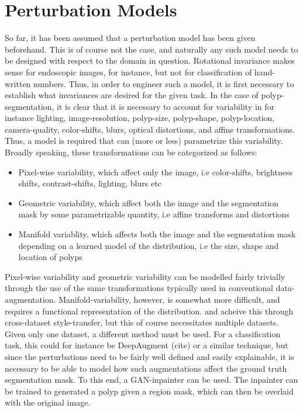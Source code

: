 \section{Perturbation Models}
So far, it has been assumed that a perturbation model has been given beforehand. This is of course not the case, and naturally any such model needs to be designed with respect to the domain in question. Rotational invariance makes sense for endoscopic images, for instance, but not for classification of hand-written numbers. Thus, in order to engineer such a model, it is first necessary to establish what invariances are desired for the given task. In the case of polyp-segmentation, it is clear that it is necessary to account for variability in for instance lighting, image-resolution, polyp-size, polyp-shape, polyp-location, camera-quality, color-shifts, blurs, optical distortions, and affine transformations. Thus, a model is required that can (more or less) parametrize this variability. Broadly speaking, these transformations can be categorized as follows:
\begin{itemize}
    \item Pixel-wise variability, which affect only the image, i.e color-shifts, brightness shifts, contrast-shifts, lighting, blurs etc
    \item Geometric variability, which affect both the image and the segmentation mask by some parametrizable quantity, i.e affine transforms and distortions
    \item Manifold variablity, which affects both the image and the segmentation mask depending on a learned model of the distribution,  i.e the size, shape and location of polyps
\end{itemize}
Pixel-wise variability and geometric variability can be modelled fairly trivially through the use of the same transformations typically used in conventional data-augmentation. Manifold-variability, however, is somewhat more difficult, and requires a functional representation of the distribution. \cite{modelbased} and \cite{cyclegan} acheive this through cross-dataset style-transfer, but this of course necessitates multiple datasets. Given only one dataset, a different method must be used. For a classification task, this could for instance be DeepAugment (cite) or a similar technique, but since the perturbations need to be fairly well defined and easily explainable, it is necessary to be able to model how such augmentations affect the ground truth segmentation mask. To this end, a GAN-inpainter can be used. The inpainter can be trained to generated a polyp given a region mask, which can then be overlaid with the original image. 

